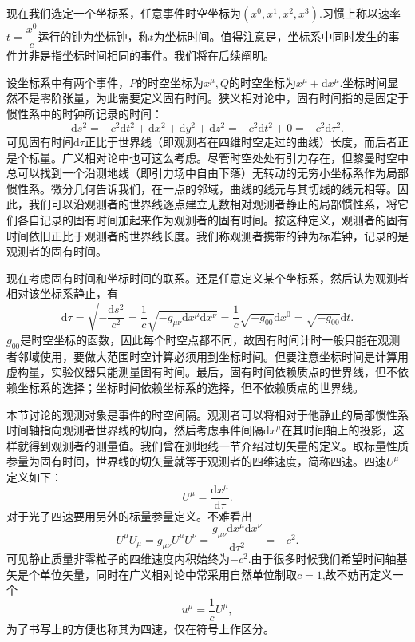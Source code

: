 \documentclass[11pt, a4paper, oneside, onecolumn]{ctexart}
\numberwithin{equation}{subsection}
\begin{document}
现在我们选定一个坐标系，任意事件时空坐标为$\left(x^{0},x^{1},x^{2},x^{3}\right)$.习惯上称以速率$t=\dfrac{x^{0}}{c}$运行的钟为坐标钟，称$t$为坐标时间。值得注意是，坐标系中同时发生的事件并非是指坐标时间相同的事件。我们将在后续阐明。

设坐标系中有两个事件，$P$的时空坐标为$x^{\mu},Q$的时空坐标为$x^{\mu}+\mathrm{d}x^{\mu}$.坐标时间显然不是零阶张量，为此需要定义固有时间。狭义相对论中，固有时间指的是固定于惯性系中的时钟所记录的时间：
\begin{equation}
\mathrm{d}s^{2}=-c^{2}\mathrm{d}t^{2}+\mathrm{d}x^{2}+\mathrm{d}y^{2}+\mathrm{d}z^{2}=-c^{2}\mathrm{d}t^{2}+0=-c^{2}\mathrm{d}\tau^{2}.
\end{equation}
可见固有时间$\mathrm{d}\tau$正比于世界线（即观测者在四维时空走过的曲线）长度，而后者正是个标量。广义相对论中也可这么考虑。尽管时空处处有引力存在，但黎曼时空中总可以找到一个沿测地线（即引力场中自由下落）无转动的无穷小坐标系作为局部惯性系。微分几何告诉我们，在一点的邻域，曲线的线元与其切线的线元相等。因此，我们可以沿观测者的世界线逐点建立无数相对观测者静止的局部惯性系，将它们各自记录的固有时间加起来作为观测者的固有时间。按这种定义，观测者的固有时间依旧正比于观测者的世界线长度。我们称观测者携带的钟为标准钟，记录的是观测者的固有时间。

现在考虑固有时间和坐标时间的联系。还是任意定义某个坐标系，然后认为观测者相对该坐标系静止，有
\begin{equation}
\mathrm{d}\tau=\sqrt{-\frac{\mathrm{d}s^{2}}{c^{2}}}=\frac{1}{c}\sqrt{-g_{\mu\nu}\mathrm{d}x^{\mu}\mathrm{d}x^{\nu}}=\frac{1}{c}\sqrt{-g_{00}}\mathrm{d}x^{0}=\sqrt{-g_{00}}\mathrm{d}t.\label{2.1.2}
\end{equation}
$g_{00}$是时空坐标的函数，因此每个时空点都不同，故固有时间计时一般只能在观测者邻域使用，要做大范围时空计算必须用到坐标时间。但要注意坐标时间是计算用虚构量，实验仪器只能测量固有时间。最后，固有时间依赖质点的世界线，但不依赖坐标系的选择；坐标时间依赖坐标系的选择，但不依赖质点的世界线。

本节讨论的观测对象是事件的时空间隔。观测者可以将相对于他静止的局部惯性系时间轴指向观测者世界线的切向，然后考虑事件间隔$\mathrm{d}x^{\mu}$在其时间轴上的投影，这样就得到观测者的测量值。我们曾在测地线一节介绍过切矢量的定义。取标量性质参量为固有时间，世界线的切矢量就等于观测者的四维速度，简称四速。四速$U^{\mu}$定义如下：
\begin{equation}
U^{\mu}=\frac{\mathrm{d}x^{\mu}}{\mathrm{d}\tau}.
\end{equation}
对于光子四速要用另外的标量参量定义。不难看出
\begin{equation}
U^{\mu}U_{\mu}=g_{\mu\nu}U^{\mu}U^{\nu}=\frac{g_{\mu\nu}\mathrm{d}x^{\mu}\mathrm{d}x^{\nu}}{\mathrm{d}\tau^{2}}=-c^{2}.
\end{equation}
可见静止质量非零粒子的四维速度内积始终为$-c^{2}$.由于很多时候我们希望时间轴基矢是个单位矢量，同时在广义相对论中常采用自然单位制取$c=1$,故不妨再定义一个
\begin{equation}
u^{\mu}=\frac{1}{c}U^{\mu},
\end{equation}
为了书写上的方便也称其为四速，仅在符号上作区分。
\end{document}
